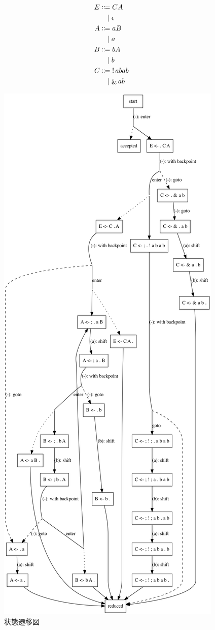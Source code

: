 \begin{align*}
  E
  &\BNFassign C A \\
  &\BNFor \epsilon \\
  A
  &\BNFassign a B \\
  &\BNFor a \\
  B
  &\BNFassign b A \\
  &\BNFor b \\
  C
  &\BNFassign \mathop{!} abab \\
  &\BNFor \mathop{\&} ab
\end{align*}

\begin{figure}
  \centering
  \includegraphics[height=0.9\textheight]{asset/implementation-note-of-peg-parser/sample-grammar.png}
  \caption{状態遷移図}
\end{figure}
